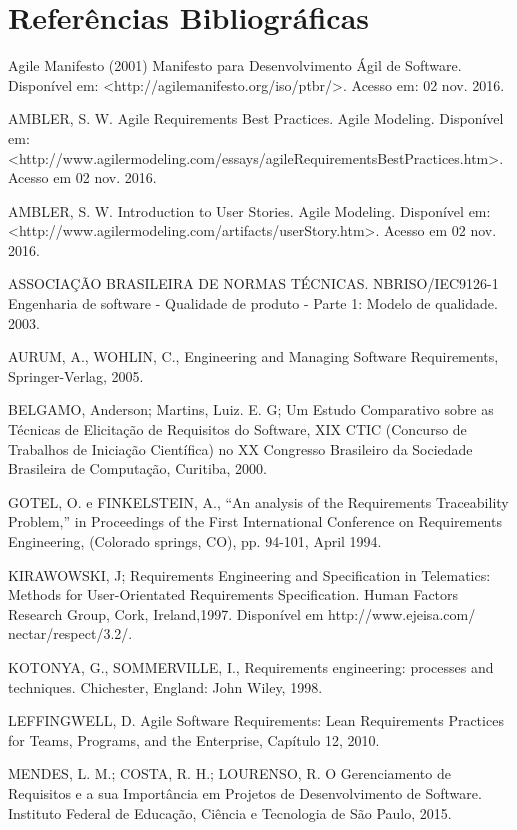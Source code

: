 \chapter[Referências Bibliográficas]{Referências Bibliográficas}

Agile Manifesto (2001) Manifesto para Desenvolvimento Ágil de Software. Disponível em: <http://agilemanifesto.org/iso/ptbr/>. Acesso em: 02 nov. 2016.

AMBLER, S. W. Agile Requirements Best Practices. Agile Modeling. Disponível em: <http://www.agilermodeling.com/essays/agileRequirementsBestPractices.htm>. Acesso em 02 nov. 2016.

AMBLER, S. W. Introduction to User Stories. Agile Modeling. Disponível em: <http://www.agilermodeling.com/artifacts/userStory.htm>. Acesso em 02 nov. 2016.

ASSOCIAÇÃO BRASILEIRA DE NORMAS TÉCNICAS. NBRISO/IEC9126-1 Engenharia de software - Qualidade de produto - Parte 1: Modelo de qualidade. 2003.

AURUM, A., WOHLIN, C., Engineering and Managing Software Requirements, Springer-Verlag, 2005. 

BELGAMO, Anderson; Martins, Luiz. E. G; Um Estudo Comparativo sobre as Técnicas de Elicitação de Requisitos do Software, XIX CTIC (Concurso de Trabalhos de Iniciação Científica) no XX Congresso Brasileiro da Sociedade Brasileira de Computação, Curitiba, 2000.

GOTEL, O. e FINKELSTEIN, A., “An analysis of the Requirements Traceability Problem,” in Proceedings of the First International Conference on Requirements Engineering, (Colorado springs, CO), pp. 94-101, April 1994.

KIRAWOWSKI, J; Requirements Engineering and Specification in Telematics: Methods for User-Orientated Requirements Specification. Human Factors Research Group, Cork, Ireland,1997. Disponível em http://www.ejeisa.com/ nectar/respect/3.2/.

KOTONYA, G., SOMMERVILLE, I., Requirements engineering: processes and
techniques. Chichester, England: John Wiley, 1998. 

LEFFINGWELL, D. Agile Software Requirements: Lean Requirements Practices for Teams, Programs, and the Enterprise, Capítulo 12, 2010.

MENDES, L. M.; COSTA, R. H.; LOURENSO, R. O Gerenciamento de Requisitos e a sua Importância em Projetos de Desenvolvimento de Software. Instituto Federal de Educação, Ciência e Tecnologia de São Paulo, 2015.

